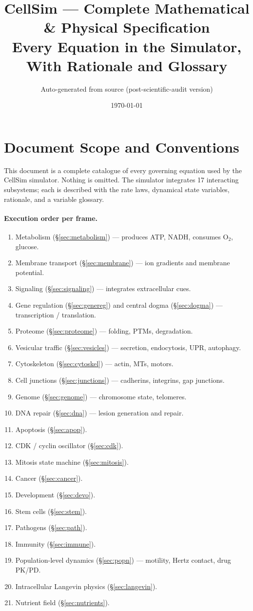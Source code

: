 \documentclass[11pt,a4paper]{article}
\title{CellSim --- Complete Mathematical \& Physical Specification \\
       \large Every Equation in the Simulator, With Rationale and Glossary}
\author{Auto-generated from source (post-scientific-audit version)}
\date{\today}
\begin{document}
\maketitle
\tableofcontents
\bigskip

\section{Document Scope and Conventions}
This document is a complete catalogue of every governing equation used by the CellSim simulator. Nothing is omitted. The simulator integrates 17 interacting subsystems; each is described with the rate laws, dynamical state variables, rationale, and a variable glossary.

\paragraph{Execution order per frame.}
\begin{enumerate}
\item Metabolism (\S\ref{sec:metabolism}) --- produces ATP, NADH, consumes O\(_2\), glucose.
\item Membrane transport (\S\ref{sec:membrane}) --- ion gradients and membrane potential.
\item Signaling (\S\ref{sec:signaling}) --- integrates extracellular cues.
\item Gene regulation (\S\ref{sec:genereg}) and central dogma (\S\ref{sec:dogma}) --- transcription / translation.
\item Proteome (\S\ref{sec:proteome}) --- folding, PTMs, degradation.
\item Vesicular traffic (\S\ref{sec:vesicles}) --- secretion, endocytosis, UPR, autophagy.
\item Cytoskeleton (\S\ref{sec:cytoskel}) --- actin, MTs, motors.
\item Cell junctions (\S\ref{sec:junctions}) --- cadherins, integrins, gap junctions.
\item Genome (\S\ref{sec:genome}) --- chromosome state, telomeres.
\item DNA repair (\S\ref{sec:dna}) --- lesion generation and repair.
\item Apoptosis (\S\ref{sec:apop}).
\item CDK / cyclin oscillator (\S\ref{sec:cdk}).
\item Mitosis state machine (\S\ref{sec:mitosis}).
\item Cancer (\S\ref{sec:cancer}).
\item Development (\S\ref{sec:devo}).
\item Stem cells (\S\ref{sec:stem}).
\item Pathogens (\S\ref{sec:path}).
\item Immunity (\S\ref{sec:immune}).
\item Population-level dynamics (\S\ref{sec:popn}) --- motility, Hertz contact, drug PK/PD.
\item Intracellular Langevin physics (\S\ref{sec:langevin}).
\item Nutrient field (\S\ref{sec:nutrients}).
\end{enumerate}
\end{document}
